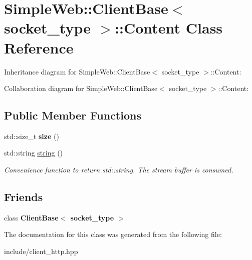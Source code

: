 \hypertarget{classSimpleWeb_1_1ClientBase_1_1Content}{}\section{Simple\+Web\+:\+:Client\+Base$<$ socket\+\_\+type $>$\+:\+:Content Class Reference}
\label{classSimpleWeb_1_1ClientBase_1_1Content}


Inheritance diagram for Simple\+Web\+:\+:Client\+Base$<$ socket\+\_\+type $>$\+:\+:Content\+:


Collaboration diagram for Simple\+Web\+:\+:Client\+Base$<$ socket\+\_\+type $>$\+:\+:Content\+:
\subsection*{Public Member Functions}
\begin{DoxyCompactItemize}
\item 
std\+::size\+\_\+t {\bfseries size} ()\hypertarget{classSimpleWeb_1_1ClientBase_1_1Content_abb1778ae99a7791659ae3cc9c231852b}{}\label{classSimpleWeb_1_1ClientBase_1_1Content_abb1778ae99a7791659ae3cc9c231852b}

\item 
std\+::string \hyperlink{classSimpleWeb_1_1ClientBase_1_1Content_a30b4ebd8ae5387c00e83a40b71812dd5}{string} ()\hypertarget{classSimpleWeb_1_1ClientBase_1_1Content_a30b4ebd8ae5387c00e83a40b71812dd5}{}\label{classSimpleWeb_1_1ClientBase_1_1Content_a30b4ebd8ae5387c00e83a40b71812dd5}

\begin{DoxyCompactList}\small\item\em Convenience function to return std\+::string. The stream buffer is consumed. \end{DoxyCompactList}\end{DoxyCompactItemize}
\subsection*{Friends}
\begin{DoxyCompactItemize}
\item 
class {\bfseries Client\+Base$<$ socket\+\_\+type $>$}\hypertarget{classSimpleWeb_1_1ClientBase_1_1Content_aee5298660229dd276c7169cf7ef3d387}{}\label{classSimpleWeb_1_1ClientBase_1_1Content_aee5298660229dd276c7169cf7ef3d387}

\end{DoxyCompactItemize}


The documentation for this class was generated from the following file\+:\begin{DoxyCompactItemize}
\item 
include/client\+\_\+http.\+hpp\end{DoxyCompactItemize}
